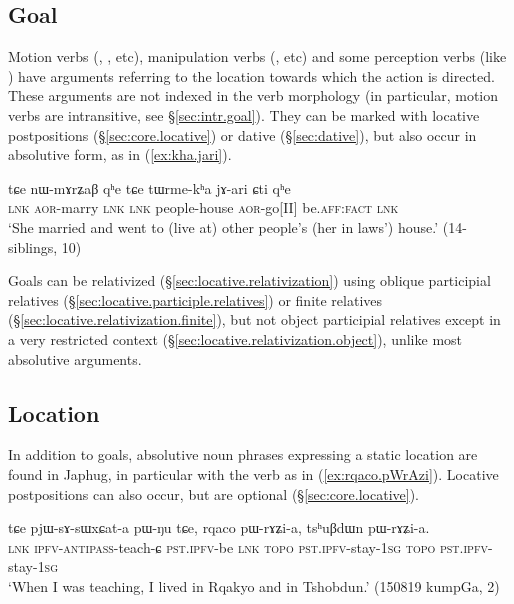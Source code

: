 \subsection{Goal} \label{absolutive.goal}  
Motion verbs (, ,  etc), manipulation verbs (,  etc) and some perception verbs (like ) have arguments referring to the location towards which the action is directed. These arguments are not indexed in the verb morphology (in particular, motion verbs are intransitive, see §\ref{sec:intr.goal}). They can be marked with locative postpositions (§\ref{sec:core.locative}) or dative (§\ref{sec:dative}), but also occur in absolutive form, as  in (\ref{ex:kha.jari}).

\begin{exe}
\ex \label{ex:kha.jari}
 \gll tɕe nɯ-mɤrʑaβ qʰe tɕe tɯrme-kʰa jɤ-ari ɕti qʰe  \\
 \textsc{lnk} \textsc{aor}-marry \textsc{lnk}  \textsc{lnk} people-house \textsc{aor}-go[II] be.\textsc{aff}:\textsc{fact} \textsc{lnk} \\
\glt `She married and went to (live at) other people's (her in laws') house.' (14-siblings, 10)
\end{exe}

Goals can be relativized (§\ref{sec:locative.relativization}) using oblique participial relatives (§\ref{sec:locative.participle.relatives}) or finite relatives (§\ref{sec:locative.relativization.finite}), but not object participial relatives except in a very restricted context (§\ref{sec:locative.relativization.object}), unlike most absolutive arguments.

\subsection{Location} \label{absolutive.locative}
In addition to goals, absolutive noun phrases expressing a static location are found in Japhug, in particular with the verb  as in (\ref{ex:rqaco.pWrAzi}).  Locative postpositions can also occur, but are optional (§\ref{sec:core.locative}).

\begin{exe}
\ex \label{ex:rqaco.pWrAzi}
 \gll  tɕe pjɯ-sɤ-sɯxɕat-a pɯ-ŋu tɕe, rqaco pɯ-rɤʑi-a, tsʰuβdɯn pɯ-rɤʑi-a. \\
 \textsc{lnk} \textsc{ipfv}-\textsc{antipass}-teach-ɕ \textsc{pst}.\textsc{ipfv}-be \textsc{lnk}  \textsc{topo} \textsc{pst}.\textsc{ipfv}-stay-\textsc{1sg}  \textsc{topo} \textsc{pst}.\textsc{ipfv}-stay-\textsc{1sg}  \\
 \glt `When I was teaching, I lived in Rqakyo and in Tshobdun.' (150819 kumpGa, 2)
\end{exe}

